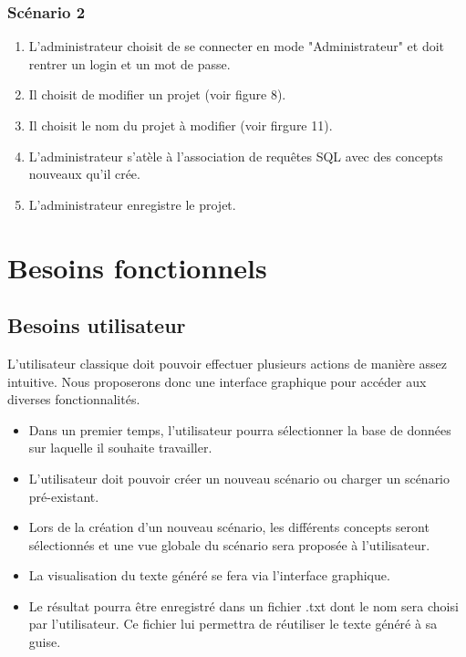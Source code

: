 \documentclass[12pt]{report}
\begin{document}
\subsubsection{Scénario 2}   
    \begin{enumerate}
    \item L'administrateur choisit de se connecter en mode "Administrateur" et doit rentrer un login et un mot de passe.
    		\item Il choisit de modifier un projet (voir figure 8).
            \item Il choisit le nom du projet à modifier (voir firgure 11).
            \item L'administrateur s'atèle à l'association de requêtes SQL avec des concepts nouveaux qu'il crée.
            \item L'administrateur enregistre le projet.
            \end{enumerate}


\section{Besoins fonctionnels}

\subsection{Besoins utilisateur}

L'utilisateur classique doit pouvoir effectuer plusieurs actions de manière assez intuitive. Nous proposerons donc une interface graphique pour accéder aux diverses fonctionnalités.

	\begin{itemize}
	\item Dans un premier temps, l'utilisateur pourra sélectionner la base de données sur laquelle il souhaite travailler.
	\item L'utilisateur doit pouvoir créer un nouveau scénario ou charger un scénario pré-existant.
	\item Lors de la création d'un nouveau scénario, les différents concepts seront sélectionnés et une vue globale du scénario sera proposée à l'utilisateur.
	\item La visualisation du texte généré se fera via l'interface graphique.
	\item Le résultat pourra être enregistré dans un fichier .txt dont le nom sera choisi par l'utilisateur. Ce fichier lui permettra de réutiliser le texte généré à sa guise.
	\end{itemize}
\end{document}
